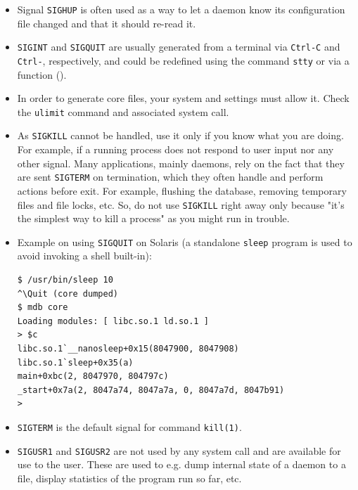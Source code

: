 \begin{itemize}
\item Signal \texttt{SIGHUP} is often used as a way to let a daemon know its
configuration file changed and that it should re-read it.
\item \texttt{SIGINT} and \texttt{SIGQUIT} are usually generated from a terminal
via \texttt{Ctrl-C} and \texttt{Ctrl-\bs}, respectively, and could be redefined
using the command \texttt{stty} or via a function ().
\item In order to generate core files, your system and settings must allow it.
Check the \texttt{ulimit} command and associated system call.
\item {} As \texttt{SIGKILL} cannot be handled, use it only if you
know what you are doing.  For example, if a running process does not respond to
user input nor any other signal.  Many applications, mainly daemons, rely on the
fact that they are sent \texttt{SIGTERM} on termination, which they often handle
and perform actions before exit. For example, flushing the database, removing
temporary files and file locks, etc. So, do not use \texttt{SIGKILL} right away
only because "it's the simplest way to kill a process" as you might run in
trouble.
\item Example on using \texttt{SIGQUIT} on Solaris (a standalone \texttt{sleep}
program is used to avoid invoking a shell built-in):

\begin{verbatim}
$ /usr/bin/sleep 10
^\Quit (core dumped)
$ mdb core
Loading modules: [ libc.so.1 ld.so.1 ]
> $c
libc.so.1`__nanosleep+0x15(8047900, 8047908)
libc.so.1`sleep+0x35(a)
main+0xbc(2, 8047970, 804797c)
_start+0x7a(2, 8047a74, 8047a7a, 0, 8047a7d, 8047b91)
>
\end{verbatim}
\item \texttt{SIGTERM} is the default signal for command \texttt{kill(1)}.
\item \texttt{SIGUSR1} and \texttt{SIGUSR2} are not used by any system call and
are available for use to the user. These are used to e.g. dump internal state
of a daemon to a file, display statistics of the program run so far, etc.
\end{itemize}


